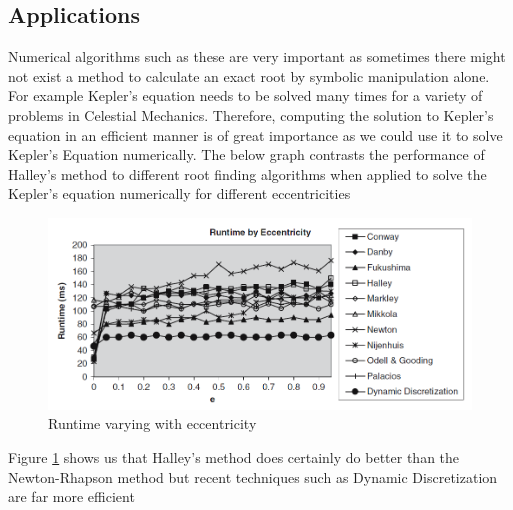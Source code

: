 \subsection{Applications}
Numerical algorithms such as these are very important as sometimes there might not exist a method to calculate an exact root by symbolic manipulation alone.
\newline For example Kepler's equation needs to be solved many times for a variety of problems in Celestial Mechanics\cite{Fein}. Therefore, computing the solution to Kepler's equation in an efficient manner
is of great importance as we could use it to solve Kepler's Equation numerically\cite{Fein}. The below graph contrasts the performance of Halley's method to different root finding algorithms when
applied to solve the Kepler's equation numerically for different eccentricities \cite{Fein}

\begin{figure}[h]
        \begin{center}
                \includegraphics[scale=0.4]{me20b050.png}
        \end{center}
        \caption{Runtime varying with eccentricity}
        \label{fig: runtime}
\end{figure}

Figure \ref{fig: runtime} shows us that Halley's method does certainly do better than the Newton-Rhapson method but recent techniques such as Dynamic Discretization are far more efficient

\newpage
